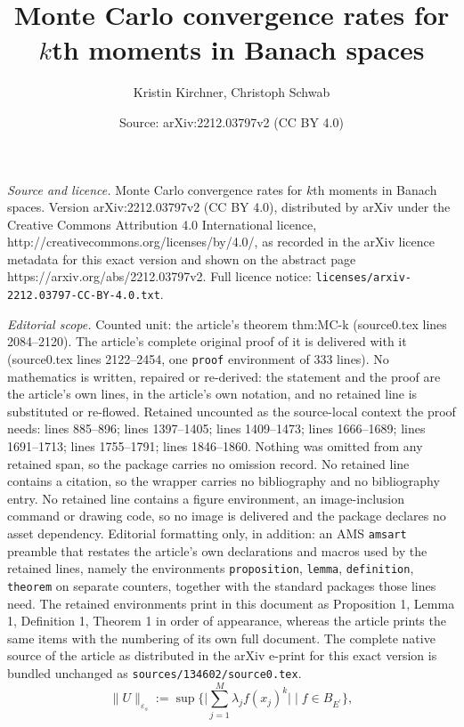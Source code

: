 \documentclass[10pt,a4paper]{amsart}
\title{Monte Carlo convergence rates for $k$th moments in Banach spaces}
\author{Kristin Kirchner, Christoph Schwab}
\date{Source: arXiv:2212.03797v2 (CC BY 4.0)}
\newcommand{\dual}[1]{{#1}^{\prime}}
\newcommand{\eps}{\varepsilon}
\newcommand{\norm}[2]{     \| #1       \|_{ #2 }}
\newcommand{\tenvec}{U}
\begin{document}
\maketitle

\noindent\emph{Source and licence.} Monte Carlo convergence rates for $k$th moments in Banach spaces. Version arXiv:2212.03797v2 (CC BY 4.0), distributed by arXiv under the Creative Commons Attribution 4.0 International licence, http://creativecommons.org/licenses/by/4.0/, as recorded in the arXiv licence metadata for this exact version and shown on the abstract page https://arxiv.org/abs/2212.03797v2. Full licence notice: \texttt{licenses/arxiv-2212.03797-CC-BY-4.0.txt}.\par\smallskip

\noindent\textit{Editorial scope.} Counted unit: the article's theorem thm:MC-k (source0.tex lines 2084--2120). The article's complete original proof of it is delivered with it (source0.tex lines 2122--2454, one \texttt{proof} environment of 333 lines). No mathematics is written, repaired or re-derived: the statement and the proof are the article's own lines, in the article's own notation, and no retained line is substituted or re-flowed.  Retained uncounted as the source-local context the proof needs: lines 885--896; lines 1397--1405; lines 1409--1473; lines 1666--1689; lines 1691--1713; lines 1755--1791; lines 1846--1860.  Nothing was omitted from any retained span, so the package carries no omission record.  No retained line contains a citation, so the wrapper carries no bibliography and no bibliography entry.  No retained line contains a figure environment, an image-inclusion command or drawing code, so no image is delivered and the package declares no asset dependency.  Editorial formatting only, in addition: an AMS \texttt{amsart} preamble that restates the article's own declarations and macros used by the retained lines, namely the environments \texttt{proposition}, \texttt{lemma}, \texttt{definition}, \texttt{theorem} on separate counters, together with the standard packages those lines need.  The retained environments print in this document as Proposition 1, Lemma 1, Definition 1, Theorem 1 in order of appearance, whereas the article prints the same items with the numbering of its own full document.  The complete native source of the article as distributed in the arXiv e-print for this exact version is bundled unchanged as \texttt{sources/134602/source0.tex}.
\begin{equation}\label{eq:sepsnorm} 
\norm{\tenvec}{\eps_s} 
:= 
\sup\Biggl\{
\biggl| 
\sum_{j=1}^M 
\lambda_j f(x_j)^k
\biggr| 
\; \Bigg| \; 
f\in B_{\dual{E}} 
\Biggr\}, 
\end{equation} 
\end{document}

